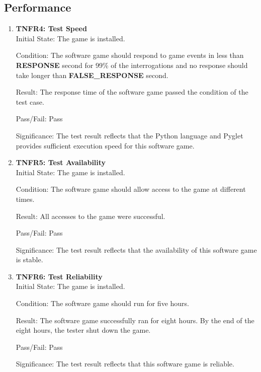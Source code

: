 \documentclass[12pt, titlepage]{article}
\begin{document}
\subsection{Performance}
\begin{enumerate}
\item{\textbf{TNFR4: Test Speed\\}}
Initial State: The game is installed.

Condition: The software game should respond to game events in less than \textbf{RESPONSE} second for 99\% of the interrogations and no response should take longer than \textbf{FALSE\_RESPONSE} second.

Result: The response time of the software game passed the condition of the test case.

Pass/Fail: Pass

Significance: The test result reflects that the Python language and Pyglet provides sufficient execution speed for this software game.

\item{\textbf{TNFR5: Test Availability\\}}
Initial State: The game is installed.

Condition: The software game should allow access to the game at different times.

Result: All accesses to the game were successful.

Pass/Fail: Pass

Significance: The test result reflects that the availability of this software game is stable.

\item{\textbf{TNFR6: Test Reliability\\}}
Initial State: The game is installed.

Condition: The software game should run for five hours.

Result: The software game successfully ran for eight hours. By the end of the eight hours, the tester shut down the game.

Pass/Fail: Pass

Significance: The test result reflects that this software game is reliable.

\end{enumerate}	
\end{document}
